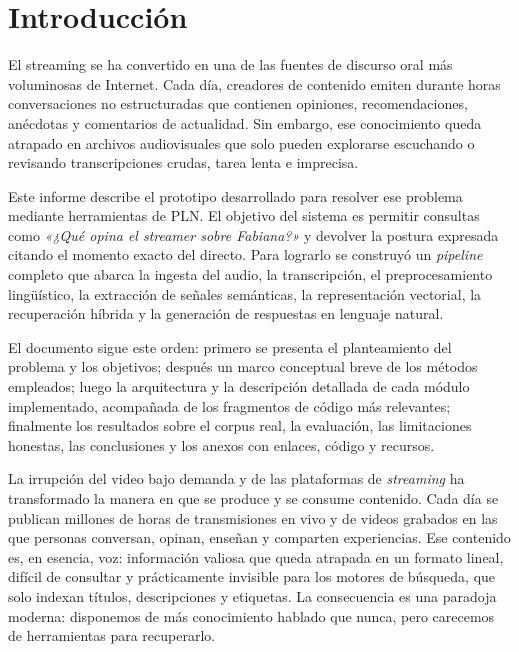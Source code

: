 \documentclass[12pt,a4paper]{article}
\begin{document}
\section{Introducción}
\label{sec:introduccion}

El streaming se ha convertido en una de las fuentes de discurso oral más voluminosas de Internet. Cada día, creadores de contenido emiten durante horas conversaciones no estructuradas que contienen opiniones, recomendaciones, anécdotas y comentarios de actualidad. Sin embargo, ese conocimiento queda atrapado en archivos audiovisuales que solo pueden explorarse escuchando o revisando transcripciones crudas, tarea lenta e imprecisa.

Este informe describe el prototipo desarrollado para resolver ese problema mediante herramientas de PLN. El objetivo del sistema es permitir consultas como \emph{«¿Qué opina el streamer sobre Fabiana?»} y devolver la postura expresada citando el momento exacto del directo. Para lograrlo se construyó un \emph{pipeline} completo que abarca la ingesta del audio, la transcripción, el preprocesamiento lingüístico, la extracción de señales semánticas, la representación vectorial, la recuperación híbrida y la generación de respuestas en lenguaje natural.

El documento sigue este orden: primero se presenta el planteamiento del problema y los objetivos; después un marco conceptual breve de los métodos empleados; luego la arquitectura y la descripción detallada de cada módulo implementado, acompañada de los fragmentos de código más relevantes; finalmente los resultados sobre el corpus real, la evaluación, las limitaciones honestas, las conclusiones y los anexos con enlaces, código y recursos.


La irrupción del video bajo demanda y de las plataformas de \emph{streaming} ha transformado la manera en que se produce y se consume contenido. Cada día se publican millones de horas de transmisiones en vivo y de videos grabados en las que personas conversan, opinan, enseñan y comparten experiencias. Ese contenido es, en esencia, voz: información valiosa que queda atrapada en un formato lineal, difícil de consultar y prácticamente invisible para los motores de búsqueda, que solo indexan títulos, descripciones y etiquetas. La consecuencia es una paradoja moderna: disponemos de más conocimiento hablado que nunca, pero carecemos de herramientas para recuperarlo.
\end{document}

